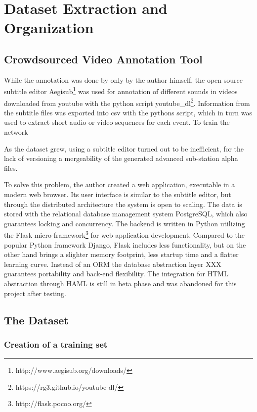 \chapter{Dataset Extraction and Organization}

\label{Extraction}


\section{Crowdsourced Video Annotation Tool}

While the annotation was done by only by the author himself, the open source subtitle editor Aegisub\footnote{http://www.aegisub.org/downloads/} was used for annotation of different sounds in videos downloaded from youtube with the python script youtube_dl\footnote{https://rg3.github.io/youtube-dl/}.
Information from the subtitle files was exported into csv with the pythons script, which in turn was used to extract short audio or video sequences for each event.
To train the network 

As the dataset grew, using a subtitle editor turned out to be inefficient, for the lack of versioning a mergeability of the generated advanced sub-station alpha files.
 
To solve this problem, the author created a web application, executable in a modern web browser.
Its user interface is similar to the subtitle editor, but through the distributed architecture the system is open to scaling.
The data is stored with the relational database management system PostgreSQL, which also guarantees locking and concurrency.
The backend is written in Python utilizing the Flask micro-framework\footnote{http://flask.pocoo.org/} for web application development.
Compared to the popular Python framework Django, Flask includes less functionality, but on the other hand brings a slighter memory footprint, less startup time and a flatter learning curve. 
Instead of an ORM the database abstraction layer XXX guarantees portability and back-end flexibility. 
The integration for HTML abstraction through HAML is still in beta phase and was abandoned for this project after testing.





\section{The Dataset}

\subsection{Creation of a training set}

